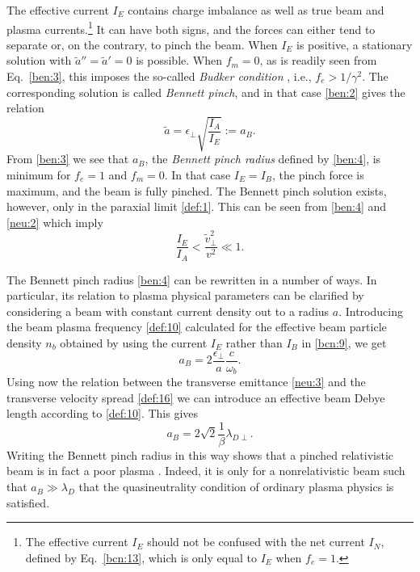 \documentclass [12pt,a4paper,     ]{report} %
\newcommand{\tr}{\pmb{\perp}}         %
\newcommand{\DEF}{:=}                 %
\begin{document}
    The effective current $I_E$ contains charge imbalance as well as true beam and plasma currents.\footnote{The effective current $I_E$ should not be confused with the net current $I_N$, defined by Eq.~\eqref{bcn:13}, which is only equal to $I_E$ when $f_e=1$.}  It can have both signs, and the forces can either tend to separate or, on the contrary, to pinch the beam.  When $I_E$ is positive, a stationary solution with $\tilde{a}'' = \tilde{a}' = 0$ is possible.  When $f_m=0$, as is readily seen from Eq.~\eqref{ben:3}, this imposes the so-called \emph{Budker condition} \cite{BUDKE1956A}, i.e., $f_e > 1/\gamma^2$. The corresponding solution is called \emph{Bennett pinch}, and in that case \eqref{ben:2} gives the relation \cite{BENNE1934-,BENNE1955-,LAWSO1958-,LAWSO1959-}
%
\begin{equation}\label{ben:4} %
      \tilde{a} = \epsilon_{\perp} \sqrt{\frac{I_A}{I_E}} \DEF a_B.
\end{equation}
%
From \eqref{ben:3} we see that $a_B$, the \emph{Bennett pinch radius} defined by \eqref{ben:4}, is minimum for $f_e=1$ and $f_m=0$.  In that case $I_E=I_B$, the pinch force is maximum, and the beam is fully pinched.  The Bennett pinch solution exists, however, only in the paraxial limit \eqref{def:1}.  This can be seen from \eqref{ben:4} and \eqref{neu:2} which imply
%
\begin{equation}\label{ben:5} %
      \frac{I_E}{I_A}   <  \frac{\tilde{v}_{\perp}^2}{v^2}  \ll 1.
\end{equation}
%

  The Bennett pinch radius \eqref{ben:4} can be rewritten in a number of ways.  In particular, its relation to plasma physical parameters can be clarified by considering a beam with constant current density out to a radius $a$.  Introducing the beam plasma frequency \eqref{def:10} calculated for the effective beam particle density $n_b$ obtained by using the current $I_E$ rather than $I_B$ in \eqref{bcn:9}, we get
%
\begin{equation}\label{ben:6} %
      a_B = 2 \frac{\epsilon_{\perp}}{a} \frac{c}{\omega_b}.
\end{equation}
%
Using now the relation between the transverse emittance \eqref{neu:3} and the transverse velocity spread \eqref{def:16} we can introduce an effective beam Debye length according to \eqref{def:10}.  This gives
%
\begin{equation}\label{ben:7} %
      a_B = 2 \sqrt{2} \frac{1}{\beta} \lambda_{D\tr}.
\end{equation}
%
Writing the Bennett pinch radius in this way shows that a pinched relativistic beam is in fact a poor plasma \cite[p.41]{DAVID1974-}.  Indeed, it is only for a nonrelativistic beam such that $a_B \gg \lambda_D$ that the quasineutrality condition of ordinary plasma physics is satisfied.
\end{document}

